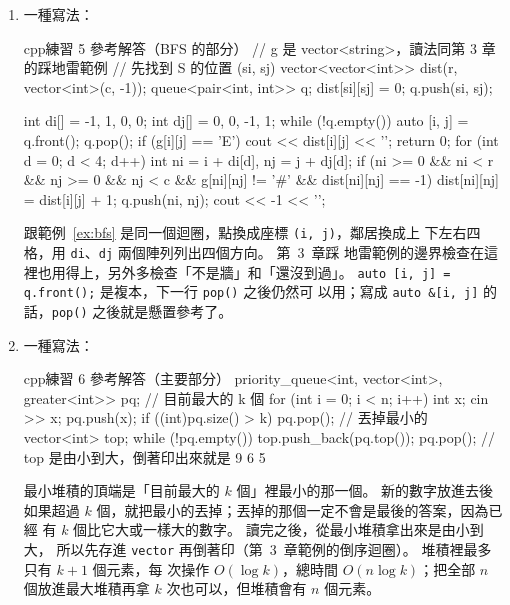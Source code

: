 \begin{enumerate}
\begin{code}{cpp}{練習 4 參考解答（讀入的迴圈）}
unordered_set<int> seen;
vector<int> order;
set<int> sorted;
for (int i = 0; i < n; i++) {
    int x;
    cin >> x;
    if (seen.count(x) == 0) {
        seen.insert(x);
        order.push_back(x);
    }
    sorted.insert(x);
}
// 接著用範圍 for 依序印出 order，再印出 sorted
\end{code}
\texttt{set} 只記得「有哪些數字」，走訪時一定由小到大，加入的順序已經丟
掉了。 要保留第一次出現的順序，就另外用 \texttt{vector} 記下來，
\texttt{seen} 只負責回答「出現過沒有」。 \texttt{seen} 從來不走訪，所以
用 \texttt{unordered\_set} 沒有順序的問題；換成 \texttt{set} 也可以。 其
實 \texttt{sorted} 就能兼做 \texttt{seen} 的工作（\texttt{sorted.count(x)}），
這裡分開寫比較清楚。 行尾會多一個空白，不想要的話照第~3~章練習 4 的寫法
處理。
\item 一種寫法：
\begin{code}{cpp}{練習 5 參考解答（BFS 的部分）}
// g 是 vector<string>，讀法同第 3 章的踩地雷範例
// 先找到 S 的位置 (si, sj)
vector<vector<int>> dist(r, vector<int>(c, -1));
queue<pair<int, int>> q;
dist[si][sj] = 0;
q.push({si, sj});

int di[] = {-1, 1, 0, 0};
int dj[] = {0, 0, -1, 1};
while (!q.empty()) {
    auto [i, j] = q.front();
    q.pop();
    if (g[i][j] == 'E') {
        cout << dist[i][j] << '\n';
        return 0;
    }
    for (int d = 0; d < 4; d++) {
        int ni = i + di[d], nj = j + dj[d];
        if (ni >= 0 && ni < r && nj >= 0 && nj < c && g[ni][nj] != '#' &&
            dist[ni][nj] == -1) {
            dist[ni][nj] = dist[i][j] + 1;
            q.push({ni, nj});
        }
    }
}
cout << -1 << '\n';
\end{code}
跟範例~\ref{ex:bfs} 是同一個迴圈，點換成座標 \texttt{(i, j)}，鄰居換成上
下左右四格，用 \texttt{di}、\texttt{dj} 兩個陣列列出四個方向。 第~3~章踩
地雷範例的邊界檢查在這裡也用得上，另外多檢查「不是牆」和「還沒到過」。
\texttt{auto [i, j] = q.front();} 是複本，下一行 \texttt{pop()} 之後仍然可
以用；寫成 \texttt{auto \&[i, j]} 的話，\texttt{pop()} 之後就是懸置參考了。
\item 一種寫法：
\begin{code}{cpp}{練習 6 參考解答（主要部分）}
priority_queue<int, vector<int>, greater<int>> pq;   // 目前最大的 k 個
for (int i = 0; i < n; i++) {
    int x;
    cin >> x;
    pq.push(x);
    if ((int)pq.size() > k) {
        pq.pop();                                     // 丟掉最小的
    }
}
vector<int> top;
while (!pq.empty()) {
    top.push_back(pq.top());
    pq.pop();
}
// top 是由小到大，倒著印出來就是 9 6 5
\end{code}
最小堆積的頂端是「目前最大的 $k$ 個」裡最小的那一個。 新的數字放進去後
如果超過 $k$ 個，就把最小的丟掉；丟掉的那個一定不會是最後的答案，因為已經
有 $k$ 個比它大或一樣大的數字。 讀完之後，從最小堆積拿出來是由小到大，
所以先存進 \texttt{vector} 再倒著印（第~3~章範例的倒序迴圈）。 堆積裡最多只有 $k + 1$ 個元素，每
次操作 $O(\log k)$，總時間 $O(n \log k)$；把全部 $n$ 個放進最大堆積再拿
$k$ 次也可以，但堆積會有 $n$ 個元素。
\end{enumerate}
